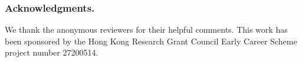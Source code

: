 \documentclass[runningheads,a4paper]{llncs}
\newcommand{\name}{{$\lambda I$}\xspace}
\begin{document}
\begin{abstract}
\begin{comment}
Our approach is inspired 
by \emph{iso-recursive types} 



Typed core (or intermediate) languages for modern 
functional languages, such as Haskell or ML, 
are becoming more and more complex. This is a natural tendency.
Programmers and language designers wish for more expressive and
powerful source-language constructs. In turn this requires new, more
powerful constructs in core languages. Unfortunately, the added
complexity means that the meta-theory and implementation of such core
languages becomes significantly harder.

This paper proposes a simple yet expressive core calculus (\name),
which has a fraction of the language constructs of existing core
languages. The key to simplicity is the combination of two ideas. The
first idea is to use a Pure Type Systems (PTS) style of syntax that
unifies the various syntactic levels of the language. However, this
creates an immediate challenge: with types and terms unified, the
\emph{decidability} of type checking requires type-level computation
to terminate, but with general recursion it is hard to have such
guarantee. The second idea, inspired by the traditional treatment of
iso-recursive types, is to solve this challenge by making each
type-level computation step explicit. The usefulness of \name is
illustrated by a light surface language built on top of \name, which
supports many advanced programming language features of
state-of-the-art functional languages. 
\end{comment}

\end{abstract}
















\subsubsection*{Acknowledgments.} We thank the anonymous reviewers for
their helpful comments. This work has been sponsored by the Hong Kong
Research Grant Council Early Career Scheme project number 27200514.




\end{document}
